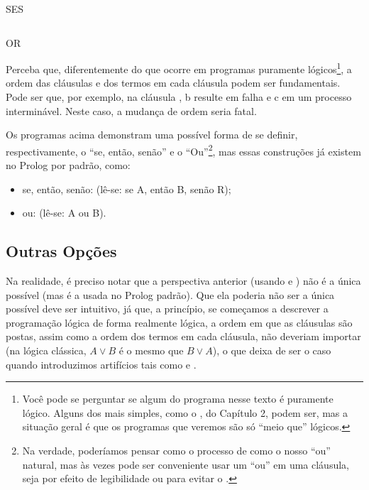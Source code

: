     \begin{listing}
\inputminted{prolog}{../Exemplos/Cap4/prog4_ifthenelse.pl}
\caption{SES}
    \end{listing}

    \begin{listing}
\inputminted{prolog}{../Exemplos/Cap4/prog5_or.pl}
\caption{OR}
    \end{listing}

Perceba que, diferentemente do que ocorre em programas puramente lógicos\footnote{Você pode se perguntar se algum do programa nesse texto é puramente lógico. Alguns dos mais simples, como o , do Capítulo 2, %
podem ser, mas a situação geral é que os programas que veremos são só ``meio que'' lógicos.}, a ordem das cláusulas e dos termos em cada cláusula podem ser fundamentais. Pode ser que, por exemplo, na cláusula , b resulte em falha e c em um
processo interminável. Neste caso, a mudança de ordem seria fatal.

Os programas acima demonstram uma possível forma de se definir, respectivamente, o ``se, então, senão'' e o ``Ou''\footnote{Na verdade, poderíamos pensar como o processo de  como o nosso ``ou'' natural, mas às vezes pode ser conveniente usar um ``ou'' em uma cláusula, seja por efeito de legibilidade ou para evitar o .}, mas essas construções já existem no Prolog por padrão, como:

\begin{itemize}
  \item se, então, senão:  (lê-se: se A, então B, senão R);
  \item ou:  (lê-se: A ou B).
\end{itemize}


\subsection{Outras Opções}

Na realidade, é preciso notar que a perspectiva anterior (usando  e
) não é a única possível (mas é a usada no Prolog padrão). Que ela poderia não
ser a única possível deve ser intuitivo, já que, a princípio, se começamos a descrever a programação lógica
de forma realmente lógica, a ordem em que as cláusulas são postas, assim como a ordem dos termos em
cada cláusula, não deveriam importar (na lógica clássica, $A \vee B$ é o mesmo que $B \vee A$), o
que deixa de ser o caso quando introduzimos artifícios tais como  e
.


